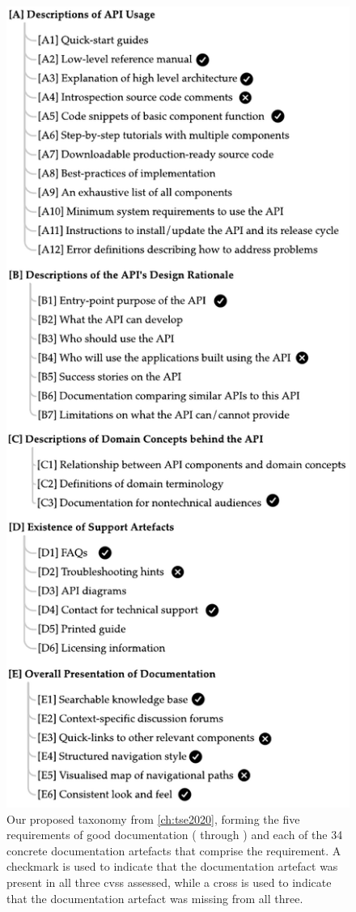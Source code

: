 \begin{figure}[p]
	\centering
	\includegraphics[width=.65\linewidth]{mainmatter/publications/figures/tse2020/taxonomy}	
	\caption[Our proposed taxonomy]{Our proposed taxonomy from \cref{ch:tse2020}, forming the five requirements of good  documentation ( through ) and each of the 34 concrete documentation artefacts that comprise the requirement. A checkmark is used to indicate that the documentation artefact was present in all three \glspl{cvs} assessed, while a cross is used to indicate that the documentation artefact was missing from all three.}
    \label{fig:conclusion:taxonomy}
\end{figure}

